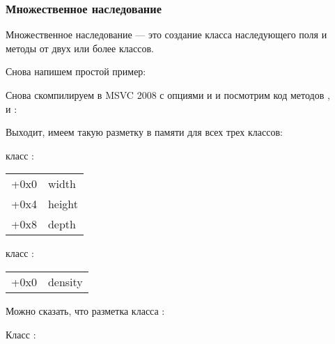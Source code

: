 \subsubsection{Множественное наследование}

Множественное наследование --- это создание класса наследующего поля и методы от двух или более классов.


Снова напишем простой пример:



Снова скомпилируем в MSVC 2008 с опциями \Ox и \Obzero и посмотрим код методов ,\\
 и :








Выходит, имеем такую разметку в памяти для всех трех классов:


класс :

\begin{center}
\begin{tabular}{ | l | l | }
\hline
  \tableheader{} \\
\hline
  +0x0 & width \\
\hline
  +0x4 & height \\
\hline
  +0x8 & depth \\
\hline
\end{tabular}
\end{center}

класс :

\begin{center}
\begin{tabular}{ | l | l | }
\hline
  \tableheader{} \\
\hline
  +0x0 & density \\
\hline
\end{tabular}
\end{center}

Можно сказать, что разметка класса  :


Класс :

